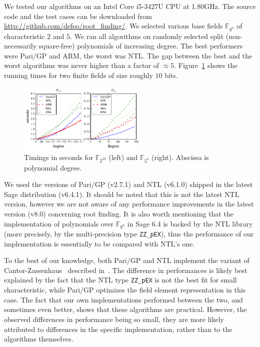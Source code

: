 \documentclass{sig-alternate}
\newcommand{\ff}[1]{\mathbb{F}_{#1}}
\newcommand{\qq}{q}
\newcommand{\nn}{n}
\newcommand{\qn}{{\qq^\nn}}
\newcommand{\extf}{\ff{\qn}}
\newcounter{algo}
\begin{document}
We tested our algorithms on an Intel Core i5-3427U CPU at 1.80GHz. The
source code and the test cases can be downloaded from
\url{http://github.com/defeo/root_finding/}. We selected various base
fields $\extf$ of characteristic $2$ and $5$. We ran all algorithms on
randomly selected split (non-necessarily square-free) polynomials of
increasing degree. The best performers were Pari/GP and ARM, the worst
was NTL. The gap between the best and the worst algorithms was never
higher than a factor of $\approx 5$. Figure~\ref{fig:benchmarks} shows
the running times for two finite fields of size roughly $10$ bits.

\begin{figure}
  \hspace{-0.05\textwidth}
  \includegraphics[width=0.55\textwidth]{benchmark}
  \caption{Timings in seconds for $\ff{2^{10}}$ (left) and $\ff{5^4}$
    (right). Abscissa is polynomial degree.}
  \label{fig:benchmarks}
\end{figure}

We used the versions of Pari/GP (v2.7.1) and NTL (v6.1.0) shipped in
the latest Sage distribution (v6.4.1). It should be noted that this is
not the latest NTL version, however we are not aware of any
performance improvements in the latest version (v8.0) concerning root
finding. It is also worth mentioning that the implementation of
polynomials over $\extf$ in Sage 6.4 is backed by the NTL library
(more precisely, by the multi-precision type \texttt{ZZ\_pEX}), thus
the performance of our implementation is essentially to be compared
with NTL's one.

To the best of our knowledge, both Pari/GP and NTL implement the
variant of Cantor-Zassenhaus~\cite{cantor1981} described
in~\cite{GathenS92}. The difference in performances is likely best
explained by the fact that the NTL type \texttt{ZZ\_pEX} is not the
best fit for small characteristic, while Pari/GP optimizes the field
element representation in this case. The fact that our own
implementations performed between the two, and sometimes even better,
shows that these algorithms are practical. However, the observed
differences in performance being so small, they are more likely
attributed to differences in the specific implementation, rather than
to the algorithms themselves.
\end{document}
